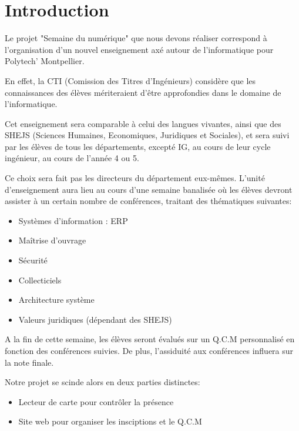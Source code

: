 \chapter{Introduction}

Le projet "Semaine du numérique" que nous devons réaliser correspond à l’organisation
d'un nouvel enseignement axé autour de l'informatique pour Polytech' Montpellier.

En effet, la CTI (Comission des Titres d'Ingénieurs) considère que les 
connaissances des élèves mériteraient d'être approfondies dans le domaine de l'informatique.

Cet enseignement sera comparable à celui des langues vivantes, ainsi que des
SHEJS (Sciences Humaines, Economiques, Juridiques et Sociales), et sera suivi
par les élèves de tous les départements, excepté IG, au cours de leur cycle 
ingénieur, au cours de l'année 4 ou 5.

Ce choix sera fait pas les directeurs du département eux-mêmes. L'unité 
d'enseignement aura lieu au cours d'une semaine banalisée où les élèves 
devront assister à un certain nombre de conférences, traitant des thématiques 
suivantes:

\begin{itemize}
\item Systèmes d’information : ERP
\item Maîtrise d’ouvrage
\item Sécurité
\item Collecticiels
\item Architecture système
\item Valeurs juridiques (dépendant des SHEJS)
\end{itemize}

A la fin de cette semaine, les élèves seront évalués sur un Q.C.M personnalisé 
en fonction des conférences suivies. De plus, l'assiduité aux conférences influera
sur la note finale.

Notre projet se scinde alors en deux parties distinctes:

\begin{itemize}
\item Lecteur de carte pour contrôler la présence
\item Site web pour organiser les insciptions et le  Q.C.M
\end{itemize}
